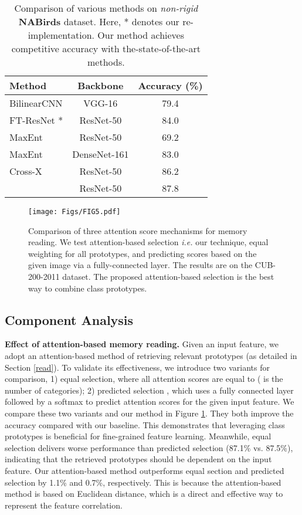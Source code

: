 \documentclass[journal]{IEEEtran}
\begin{document}
\setlength{\tabcolsep}{13pt}
\begin{table}[t]
\caption{Comparison of various methods on \emph{non-rigid} \textbf{NABirds} dataset. Here, * denotes our re-implementation. Our method achieves competitive accuracy with the-state-of-the-art methods.}
\small
\begin{center}
\begin{tabular}{|l|c|c|}
\hline
Method    & Backbone & Accuracy (\%)\\
\hline\hline
BilinearCNN \cite{LinRM18} & VGG-16 & 79.4 \\
FT-ResNet \cite{he2016deep}* & ResNet-50 & 84.0 \\
MaxEnt \cite{dubey2018maximum} & ResNet-50 & 69.2 \\
MaxEnt \cite{dubey2018maximum} & DenseNet-161 & 83.0 \\
Cross-X \cite{luo2019cross} & ResNet-50 & 86.2 \\
\hline
 \rowcolor{mygray}{CMN (ours)}    & ResNet-50    &{87.8}\\
\hline
\end{tabular}
\end{center}
\label{tab5}
\end{table}

\begin{figure}[t]
    \centering
   {\texttt{[image: Figs/FIG5.pdf]}}\caption{Comparison of three attention score mechanisms for memory reading. We test attention-based selection \emph{i.e.} our technique, equal weighting for all prototypes, and predicting scores based on the given image via a fully-connected layer. The results are on the CUB-200-2011 dataset. The proposed attention-based selection is the best way to combine class prototypes.
    }
    \label{fig_ab}\end{figure}


\subsection{Component Analysis}
\textbf{Effect of attention-based memory reading.}
Given an input feature, we adopt an attention-based method of retrieving relevant prototypes (as detailed in Section \ref{read}). To validate its effectiveness, we introduce two variants for comparison, 1) equal selection, where all attention scores are equal to  ( is the number of categories); 2) predicted selection \cite{li2016learning}, which uses a fully connected layer followed by a softmax to predict attention scores for the given input feature. 
We compare these two variants and our method in Figure \ref{fig_ab}. They both improve the accuracy compared with our baseline. This demonstrates that leveraging class prototypes is beneficial for fine-grained feature learning. Meanwhile, equal selection delivers worse performance than predicted selection (87.1\% vs. 87.5\%), indicating that the retrieved prototypes should be dependent on the input feature.
Our attention-based method outperforms equal section and predicted selection by 1.1\% and 0.7\%, respectively. This is because the attention-based method is based on Euclidean distance, which is a direct and effective way to represent the feature correlation.
\end{document}
